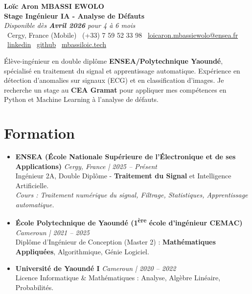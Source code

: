 \documentclass[a4paper,11pt]{article}
\begin{document}
\begin{center}
    {\Large \textbf{Loïc Aron MBASSI EWOLO}} \\ \vspace{4pt}
    \textbf{\large Stage Ingénieur IA - Analyse de Défauts} \\
    \textit{\small Disponible dès \textbf{Avril 2026} pour 4 à 6 mois} \\ \vspace{4pt}
    \small
    \faMapMarker\ Cergy, France (Mobile) \quad
    \faPhone\ (+33) 7 59 52 33 98 \quad
    \faEnvelope\ \href{mailto:loicaron.mbassiewolo@ensea.fr}{loicaron.mbassiewolo@ensea.fr} \\ \vspace{2pt}
    \faLinkedin\ \href{https://www.linkedin.com/in/loic-aron-mbassi-ewolo-3942a9246/}{linkedin} \quad
    \faGithub\ \href{https://github.com/Nameless0l}{github} \quad
    \faGlobe\ \href{https://mbassiloic.tech}{mbassiloic.tech}
\end{center}

\vspace{-6pt}

\noindent\small{Élève-ingénieur en double diplôme \textbf{ENSEA/Polytechnique Yaoundé}, spécialisé en traitement du signal et apprentissage automatique. Expérience en détection d'anomalies sur signaux (ECG) et en classification d'images. Je recherche un stage au \textbf{CEA Gramat} pour appliquer mes compétences en Python et Machine Learning à l'analyse de défauts.}

\section{Formation}
\begin{itemize}[leftmargin=*, label=\tiny$\bullet$, nosep]
    \item \textbf{ENSEA (École Nationale Supérieure de l'Électronique et de ses Applications)} \hfill \textit{Cergy, France | 2025 -- Présent} \\
    \small{Ingénieur 2A, Double Diplôme - \textbf{Traitement du Signal} et Intelligence Artificielle.} \\
    \textit{\small{Cours : Traitement numérique du signal, Filtrage, Statistiques, Apprentissage automatique.}}
    \vspace{2pt}
    \item \textbf{École Polytechnique de Yaoundé (1\textsuperscript{ère} école d'ingénieur CEMAC)} \hfill \textit{Cameroun | 2021 -- 2025} \\
    \small{Diplôme d'Ingénieur de Conception (Master 2) : \textbf{Mathématiques Appliquées}, Algorithmique, Génie Logiciel.}
    \item \textbf{Université de Yaoundé I} \hfill \textit{Cameroun | 2020 -- 2022} \\
    \small{Licence Informatique \& Mathématiques : Analyse, Algèbre Linéaire, Probabilités.}
\end{itemize}
\end{document}
